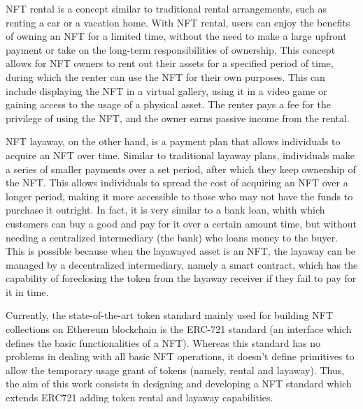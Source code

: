 \documentclass[english, LaM, oneside]{sapthesis}%
\begin{document}
NFT rental is a concept similar to traditional rental arrangements, such as renting a car or a vacation home. With NFT rental, users can enjoy the benefits of owning an NFT for a limited time, without the need to make a large upfront payment or take on the long-term responsibilities of ownership.
This concept allows for NFT owners to rent out their assets for a specified period of time, during which the renter can use the NFT for their own purposes. This can include displaying the NFT in a virtual gallery, using it in a video game or gaining access to the usage of a physical asset. The renter pays a fee for the privilege of using the NFT, and the owner earns passive income from the rental.\newline

NFT layaway, on the other hand, is a payment plan that allows individuals to acquire an NFT over time. Similar to traditional layaway plans, individuals make a series of smaller payments over a set period, after which they keep ownership of the NFT. This allows individuals to spread the cost of acquiring an NFT over a longer period, making it more accessible to those who may not have the funds to purchase it outright. In fact, it is very similar to a bank loan, whith which customers can buy a good and pay for it over a certain amount time, but without needing a centralized intermediary (the bank) who loans money to the buyer. This is possible because when the layawayed asset is an NFT, the layaway can be managed by a decentralized intermediary, namely a smart contract, which has the capability of foreclosing the token from the layaway receiver if they fail to pay for it in time.\newline

Currently, the state-of-the-art token standard mainly used for building NFT collections on Ethereum blockchain is the ERC-721 standard\cite{ref:EIP721} (an interface which defines the basic functionalities of a NFT). Whereas this standard has no problems in dealing with all basic NFT operations, it doesn't define primitives to allow the temporary usage grant of tokens (namely, rental and layaway).
Thus, the aim of this work consists in designing and developing a NFT standard which extends ERC721 adding token rental and layaway capabilities.\newline
\end{document}
